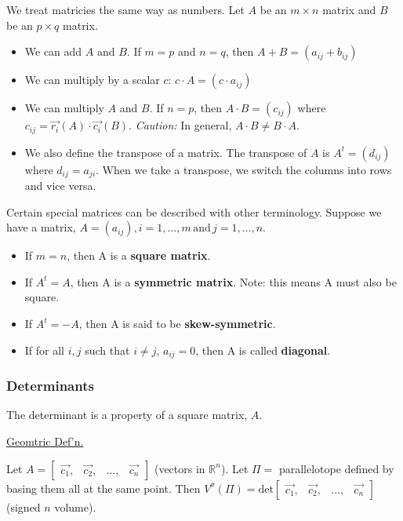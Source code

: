 \documentclass[../main.tex]{subfiles}
\begin{document}
We treat matricies the same way as numbers.
Let \( A \) be an \( m \times n \) matrix and \( B \) be an \( p \times q \) matrix.
\begin{itemize}[mode=unboxed]
    \item We can add \( A \) and \( B \). If \( m=p \) and \( n=q \), then \( A+B = ( a_{ij}+b_{ij} ) \)
    \item We can multiply by a scalar \( c \): \( c \cdot A = ( c \cdot a_{ij} ) \)
    \item We can multiply \( A \) and \( B \). If \( n=p \), then \( A \cdot B = (c_{ij}) \) where \( c_{ij} = \vec{r_{i}}(A) \cdot \vec{c_{i}}(B) \).
        \emph{Caution:} In general, \( A \cdot B \neq B \cdot A \).
    \item We also define the transpose of a matrix. The transpose of \( A \) is \( A^t = (d_{ij}) \) where \( d_{ij} = a_{ji} \).
        When we take a transpose, we switch the columns into rows and vice versa.
\end{itemize}

Certain special matrices can be described with other terminology.
Suppose we have a matrix, \( A = (a_{ij}), i = 1, \dots ,m \, \text{and} \, j = 1, \dots ,n \).
\begin{itemize}
    \item If \( m=n \), then A is a \textbf{square matrix}.
    \item If \( A^t = A \), then A is a \textbf{symmetric matrix}. Note: this means A must also be square.
    \item If \( A^t = -A \), then A is said to be \textbf{skew-symmetric}.
    \item If for all \( i,j \) such that \( i \neq j \), \( a_{ij} = 0 \), then A is called \textbf{diagonal}.
\end{itemize}

\subsubsection{Determinants}

The determinant is a property of a square matrix, \( A \).

\underline{Geomtric Def'n.}

Let \( A = \begin{bmatrix}
    \vec{c_1}, & \vec{c_2}, & \dots, & \vec{c_n}
\end{bmatrix} \)
(vectors in \( \mathbb{R}^n \)).
Let \( \Pi = \) parallelotope defined by basing them all at the same point.
Then \( V^\sigma(\Pi) = \text{det} \begin{bmatrix}
    \vec{c_1}, & \vec{c_2}, & \dots, & \vec{c_n}
\end{bmatrix} \) (signed \( n \) volume).
\end{document}
